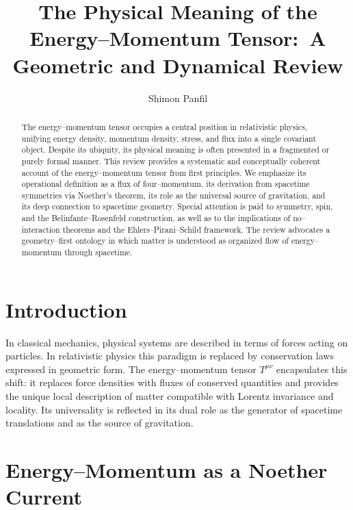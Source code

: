 \documentclass[11pt,a4paper]{article}
\title{The Physical Meaning of the Energy--Momentum Tensor:\
A Geometric and Dynamical Review}
\author{Shimon Panfil}
\date{}
\begin{document}
\maketitle

\begin{abstract}
The energy--momentum tensor occupies a central position in relativistic physics, unifying energy density, momentum density, stress, and flux into a single covariant object. Despite its ubiquity, its physical meaning is often presented in a fragmented or purely formal manner. This review provides a systematic and conceptually coherent account of the energy--momentum tensor from first principles. We emphasize its operational definition as a flux of four--momentum, its derivation from spacetime symmetries via Noether's theorem, its role as the universal source of gravitation, and its deep connection to spacetime geometry. Special attention is paid to symmetry, spin, and the Belinfante--Rosenfeld construction, as well as to the implications of no--interaction theorems and the Ehlers--Pirani--Schild framework. The review advocates a geometry--first ontology in which matter is understood as organized flow of energy--momentum through spacetime.
\end{abstract}

\section{Introduction}
In classical mechanics, physical systems are described in terms of forces acting on particles. In relativistic physics this paradigm is replaced by conservation laws expressed in geometric form. The energy--momentum tensor $T^{\mu\nu}$ encapsulates this shift: it replaces force densities with fluxes of conserved quantities and provides the unique local description of matter compatible with Lorentz invariance and locality. Its universality is reflected in its dual role as the generator of spacetime translations and as the source of gravitation.

\section{Energy--Momentum as a Noether Current}
\end{document}
